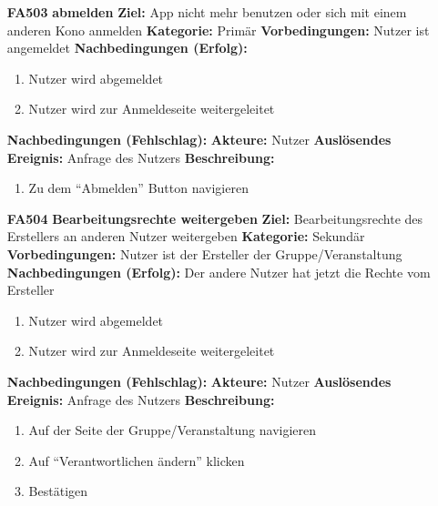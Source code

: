 \documentclass[parskip=full]{scrartcl}
\begin{document}
\begin{itemize}[nosep]
			\item[\textbf{FA503}]\textbf{abmelden}
							\newline \textbf{Ziel:} App nicht mehr benutzen oder sich mit einem anderen Kono anmelden
							\newline \textbf{Kategorie:} Primär
							\newline \textbf{Vorbedingungen:} Nutzer ist angemeldet
							\newline \textbf{Nachbedingungen (Erfolg):} 
							\begin{enumerate}[nosep]
								\item Nutzer wird abgemeldet
								\item Nutzer wird zur Anmeldeseite weitergeleitet 
							\end{enumerate}
							\textbf{Nachbedingungen (Fehlschlag):}
							\newline \textbf{Akteure:} Nutzer
							\newline \textbf{Auslösendes Ereignis:} Anfrage des Nutzers
							\newline \textbf{Beschreibung:}
							\begin{enumerate}[nosep]
								\item Zu dem “Abmelden” Button navigieren\\
							\end{enumerate}
			
			\item[\textbf{FA504}]\textbf{Bearbeitungsrechte weitergeben} \label{sec:FA504}
							\newline \textbf{Ziel:} Bearbeitungsrechte des Erstellers an anderen Nutzer weitergeben
							\newline \textbf{Kategorie:} Sekundär
							\newline \textbf{Vorbedingungen:} Nutzer ist der Ersteller der Gruppe/Veranstaltung
							\newline \textbf{Nachbedingungen (Erfolg):} Der andere Nutzer hat jetzt die Rechte vom Ersteller
							\begin{enumerate}[nosep]
								\item Nutzer wird abgemeldet
								\item Nutzer wird zur Anmeldeseite weitergeleitet 
							\end{enumerate}
							\textbf{Nachbedingungen (Fehlschlag):}
							\newline \textbf{Akteure:} Nutzer
							\newline \textbf{Auslösendes Ereignis:} Anfrage des Nutzers
							\newline \textbf{Beschreibung:}
							\begin{enumerate}[nosep]
								\item Auf der Seite der Gruppe/Veranstaltung navigieren\\
								\item Auf “Verantwortlichen ändern” klicken
								\item Bestätigen
							\end{enumerate}
							
		\end{itemize}
		
\end{document}
